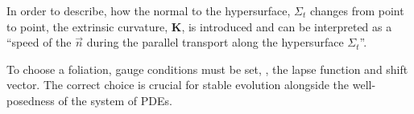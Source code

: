 
In order to describe, how the normal to the hypersurface, $\Sigma_t$ changes 
from point to point, the extrinsic curvature, $\boldsymbol{K}$, is introduced 
%
and can be interpreted as a ``speed of the $\vec{n}$ during the parallel 
transport along the hypersurface $\Sigma_t$''. 



To choose a foliation, gauge conditions must be set, \ie, the 
lapse function and shift vector. 
The correct choice is crucial for stable evolution 
\citep{Alcubierre:2002kk}
alongside the well-posedness of the system of \acp{PDE}.
%

